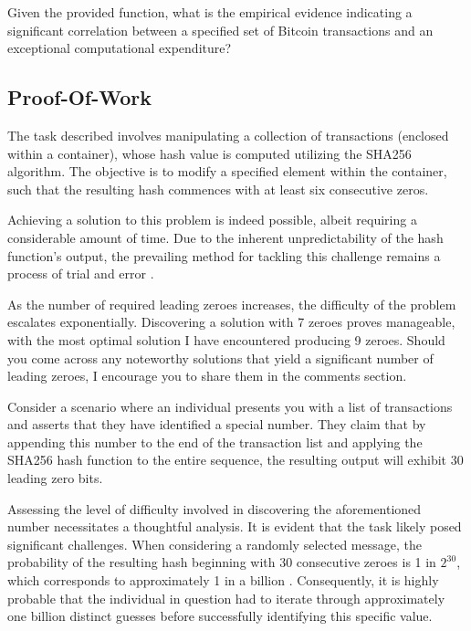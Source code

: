 Given the provided function, what is the empirical evidence indicating a significant correlation between a specified set of Bitcoin transactions and an exceptional computational expenditure?

\subsection{Proof-Of-Work}
The task described involves manipulating a collection of transactions (enclosed within a container), whose hash value is computed utilizing the SHA256 algorithm. The objective is to modify a specified element within the container, such that the resulting hash commences with at least six consecutive zeros.

Achieving a solution to this problem is indeed possible, albeit requiring a considerable amount of time. Due to the inherent unpredictability of the hash function's output, the prevailing method for tackling this challenge remains a process of trial and error \cite{Dworkin2001}.

As the number of required leading zeroes increases, the difficulty of the problem escalates exponentially. Discovering a solution with 7 zeroes proves manageable, with the most optimal solution I have encountered producing 9 zeroes. Should you come across any noteworthy solutions that yield a significant number of leading zeroes, I encourage you to share them in the comments section.

Consider a scenario where an individual presents you with a list of transactions and asserts that they have identified a special number. They claim that by appending this number to the end of the transaction list and applying the SHA256 hash function to the entire sequence, the resulting output will exhibit 30 leading zero bits.

Assessing the level of difficulty involved in discovering the aforementioned number necessitates a thoughtful analysis. It is evident that the task likely posed significant challenges. When considering a randomly selected message, the probability of the resulting hash beginning with 30 consecutive zeroes is 1 in $2^{30}$, which corresponds to approximately 1 in a billion \cite{Dworkin2001}. Consequently, it is highly probable that the individual in question had to iterate through approximately one billion distinct guesses before successfully identifying this specific value.

%

